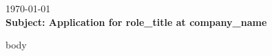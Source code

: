 \documentclass[a4paper,11pt]{article}
\begin{document}
\vspace{8pt}

{\fontsize{10pt}{12pt}\selectfont\color{textgray}
\today\\[4pt]
\textbf{Subject: Application for {{role_title}} at {{company_name}}}
}
\vspace{8pt}

{\fontsize{11pt}{14.5pt}\selectfont\color{textdark}
\noindent
{{body}}
}
\end{document}
